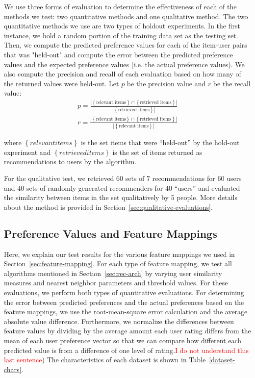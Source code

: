 \documentclass{article}
\begin{document}
We use three forms of evaluation to determine the effectiveness of each of the methods we test: two quantitative
methods and one qualitative method. The two quantitative methods we use are two types of holdout experiments.
In the first instance, we hold a random portion of the training data set as the testing set. Then, we compute the 
predicted preference values for each of the item-user pairs that was "held-out" and compute the error between
the predicted preference values and the expected preference values (i.e. the actual preference values). We
also compute the precision and recall of each evaluation based on how many of the returned values
were held-out. Let $p$ be the precision value and $r$ be the recall value:\begin{align*}
p = \frac{|\left\{ \text{relevant items} \right\} \cap \left\{\text{retrieved items}\right\}|}{|\left\{\text{retrieved items}\right\}|}
\end{align*}
\begin{align*}
r = \frac{|\left\{ \text{relevant items} \right\} \cap \left\{\text{retrieved items}\right\}|}{|\left\{\text{relevant items}\right\}|}
\end{align*} 

where $\left\{relevant items\right\}$ is the set items that were ``held-out'' by the hold-out experiment and $\left\{retrieved items\right\}$ is the set of items returned as recommendations to users by the algorithm.

For the qualitative test, we retrieved $60$ sets of $7$ recommendations for $60$ users and $40$ sets of randomly
generated recommenders for $40$ ``users'' and evaluated the similarity between items in the set qualitatively by 5 
people. More details about the method is provided in Section~\ref{sec:qualitative-evaluations}. 

\subsection{Preference Values and Feature Mappings}

Here, we explain our test results for the various feature mappings we used in Section~\ref{sec:feature-mapping}. 
For each type of feature mapping, we test all algorithms mentioned in Section~\ref{sec:rec-arch} by varying user
similarity measures and nearest neighbor parameters and threshold values. For these evaluations, 
we perform both types of quantitative evaluations. For determining the error between predicted preferences and 
the actual preferences based on the feature mappings, we use the root-mean-square error calculation and the average
absolute value difference. Furthermore, we normalize the differences between feature values by dividing by the average
amount each user rating differs from the mean of each user preference vector so that we can compare
how different each predicted value is from a difference of one level of rating.\textcolor{red}{I do not understand this last sentence}) The characteristics of each dataset is
shown in Table~\ref{dataset-chars}.
\end{document}
